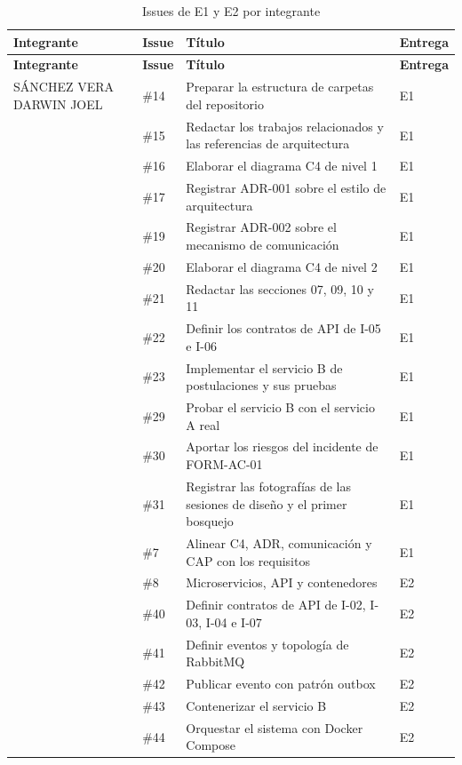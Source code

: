 \begingroup\small
\begin{longtable}{@{}>{\raggedright\arraybackslash}p{}>{\raggedright\arraybackslash}p{}>{\raggedright\arraybackslash}p{}>{\raggedright\arraybackslash}p{}@{}}
\caption{Issues de E1 y E2 por integrante}\label{tab:issues}\\
\toprule
\textbf{Integrante} & \textbf{Issue} & \textbf{Título} & \textbf{Entrega}\\
\midrule\endfirsthead
\toprule\textbf{Integrante} & \textbf{Issue} & \textbf{Título} & \textbf{Entrega}\\\midrule\endhead
\bottomrule\endfoot
SÁNCHEZ VERA DARWIN JOEL & \#14 & Preparar la estructura de carpetas del repositorio & E1\\
 & \#15 & Redactar los trabajos relacionados y las referencias de arquitectura & E1\\
 & \#16 & Elaborar el diagrama C4 de nivel 1 & E1\\
 & \#17 & Registrar ADR-001 sobre el estilo de arquitectura & E1\\
 & \#19 & Registrar ADR-002 sobre el mecanismo de comunicación & E1\\
 & \#20 & Elaborar el diagrama C4 de nivel 2 & E1\\
 & \#21 & Redactar las secciones 07, 09, 10 y 11 & E1\\
 & \#22 & Definir los contratos de API de I-05 e I-06 & E1\\
 & \#23 & Implementar el servicio B de postulaciones y sus pruebas & E1\\
 & \#29 & Probar el servicio B con el servicio A real & E1\\
 & \#30 & Aportar los riesgos del incidente de FORM-AC-01 & E1\\
 & \#31 & Registrar las fotografías de las sesiones de diseño y el primer bosquejo & E1\\
 & \#7 & Alinear C4, ADR, comunicación y CAP con los requisitos & E1\\
 & \#8 & Microservicios, API y contenedores & E2\\
 & \#40 & Definir contratos de API de I-02, I-03, I-04 e I-07 & E2\\
 & \#41 & Definir eventos y topología de RabbitMQ & E2\\
 & \#42 & Publicar evento con patrón outbox & E2\\
 & \#43 & Contenerizar el servicio B & E2\\
 & \#44 & Orquestar el sistema con Docker Compose & E2\\

\end{longtable}
